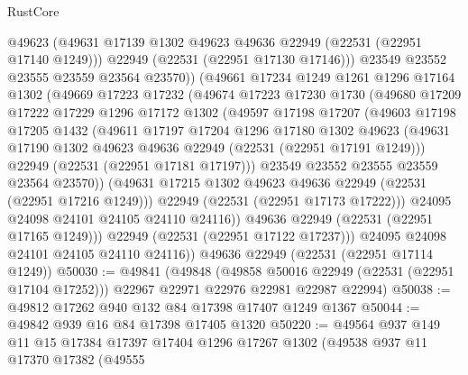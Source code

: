 \begin{lexlean}{RustCore}
\begin{coremodule}
                @49623
                (@49631 @17139 @1302 @49623 @49636 @22949 (@22531 (@22951 @17140 @1249)))
                @22949
                (@22531 (@22951 @17130 @17146)))
              @23549
              @23552
              @23555
              @23559
              @23564
              @23570))
          (@49661
            @17234
            @1249
            @1261
            @1296
            @17164
            @1302
            (@49669
              @17223
              @17232
              (@49674
                @17223
                @17230
                @1730
                (@49680
                  @17209
                  @17222
                  @17229
                  @1296
                  @17172
                  @1302
                  (@49597
                    @17198
                    @17207
                    (@49603
                      @17198
                      @17205
                      @1432
                      (@49611
                        @17197
                        @17204
                        @1296
                        @17180
                        @1302
                        @49623
                        (@49631 @17190 @1302 @49623 @49636 @22949 (@22531 (@22951 @17191 @1249)))
                        @22949
                        (@22531 (@22951 @17181 @17197)))
                      @23549
                      @23552
                      @23555
                      @23559
                      @23564
                      @23570))
                  (@49631 @17215 @1302 @49623 @49636 @22949 (@22531 (@22951 @17216 @1249)))
                  @22949
                  (@22531 (@22951 @17173 @17222)))
                @24095
                @24098
                @24101
                @24105
                @24110
                @24116))
            @49636
            @22949
            (@22531 (@22951 @17165 @1249)))
          @22949
          (@22531 (@22951 @17122 @17237)))
        @24095
        @24098
        @24101
        @24105
        @24110
        @24116))
    @49636
    @22949
    (@22531 (@22951 @17114 @1249))
@50030 := @49841
    (@49848
      (@49858 @50016 @22949 (@22531 (@22951 @17104 @17252)))
      @22967
      @22971
      @22976
      @22981
      @22987
      @22994)
@50038 := @49812 @17262 @940 @132 @84 @17398 @17407 @1249 @1367
@50044 := @49842 @939 @16 @84 @17398 @17405 @1320
@50220 := @49564
    @937
    @149
    @11
    @15
    @17384
    @17397
    @17404
    @1296
    @17267
    @1302
    (@49538
      @937
      @11
      @17370
      @17382
      (@49555

\end{coremodule}
\end{lexlean}
